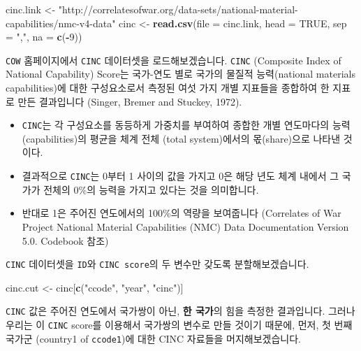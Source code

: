 \documentclass[]{book}
\newenvironment{Shaded}{\begin{snugshade}}{\end{snugshade}}
\newcommand{\DataTypeTok}[1]{\textcolor[rgb]{0.13,0.29,0.53}{#1}}
\newcommand{\DecValTok}[1]{\textcolor[rgb]{0.00,0.00,0.81}{#1}}
\newcommand{\KeywordTok}[1]{\textcolor[rgb]{0.13,0.29,0.53}{\textbf{#1}}}
\newcommand{\NormalTok}[1]{#1}
\newcommand{\OperatorTok}[1]{\textcolor[rgb]{0.81,0.36,0.00}{\textbf{#1}}}
\newcommand{\OtherTok}[1]{\textcolor[rgb]{0.56,0.35,0.01}{#1}}
\newcommand{\StringTok}[1]{\textcolor[rgb]{0.31,0.60,0.02}{#1}}
\providecommand{\tightlist}{%
  \setlength{\itemsep}{0pt}\setlength{\parskip}{0pt}}
\begin{document}
\begin{Shaded}
\begin{Highlighting}[]
\NormalTok{cinc.link <-}\StringTok{ }
\StringTok{  "http://correlatesofwar.org/data-sets/national-material-capabilities/nmc-v4-data"}
\NormalTok{cinc <-}
\StringTok{  }\KeywordTok{read.csv}\NormalTok{(}\DataTypeTok{file =}\NormalTok{ cinc.link,}
           \DataTypeTok{head =} \OtherTok{TRUE}\NormalTok{,}
           \DataTypeTok{sep =} \StringTok{","}\NormalTok{,}
           \DataTypeTok{na =} \KeywordTok{c}\NormalTok{(}\OperatorTok{-}\DecValTok{9}\NormalTok{))}
\end{Highlighting}
\end{Shaded}

\texttt{COW} 홈페이지에서 \texttt{CINC} 데이터셋을 로드해보겠습니다. \texttt{CINC} (Composite Index of National Capability) Score는 국가-연도 별로 국가의 물질적 능력(national materials capabilities)에 대한 구성요소로서 측정된 여섯 가지 개별 지표들을 종합하여 한 지표로 만든 결과입니다 (Singer, Bremer and Stuckey, 1972).

\begin{itemize}
\tightlist
\item
  \texttt{CINC}는 각 구성요소를 동등하게 가중치를 부여하여 종합한 개별 연도마다의 능력 (capabilities)의 평균을 체계 전체 (total system)에서의 몫(share)으로 나타낸 것이다.
\item
  결과적으로 \texttt{CINC}는 0부터 1 사이의 값을 가지고 0은 해당 년도 체계 내에서 그 국가가 전체의 0\%의 능력을 가지고 있다는 것을 의미합니다.
\item
  반대로 1은 주어진 연도에서의 100\%의 역량을 보여줍니다 (Correlates of War Project National Material Capabilities (NMC) Data Documentation Version 5.0. Codebook 참조)
\end{itemize}

\texttt{CINC} 데이터셋을 \texttt{ID}와 \texttt{CINC\ score}의 두 변수만 갖도록 분할해보겠습니다.

\begin{Shaded}
\begin{Highlighting}[]
\NormalTok{cinc.cut <-}\StringTok{ }\NormalTok{cinc[}\KeywordTok{c}\NormalTok{(}\StringTok{"ccode"}\NormalTok{, }\StringTok{"year"}\NormalTok{, }\StringTok{"cinc"}\NormalTok{)]}
\end{Highlighting}
\end{Shaded}

\texttt{CINC} 값은 주어진 연도에서 국가쌍이 아닌, \textbf{한 국가}의 힘을 측정한 결과입니다. 그러나 우리는 이 \texttt{CINC} score를 이용해서 국가쌍의 변수로 만들 것이기 때문에, 먼저, 첫 번째 국가군 (country1 of \texttt{ccode1})에 대한 CINC 자료들을 머지해보겠습니다.
\end{document}
